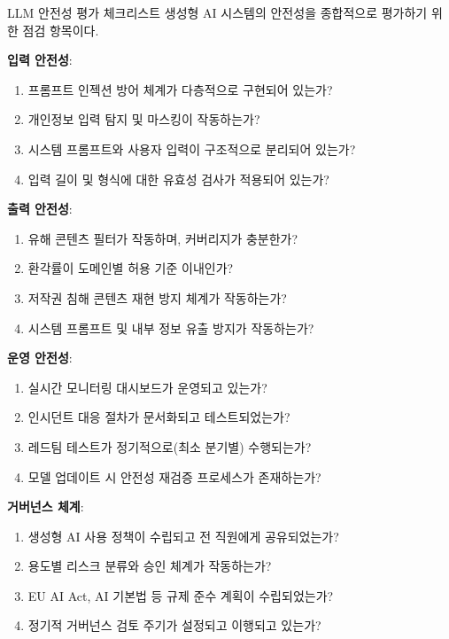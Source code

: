 \begin{practicaltool}{LLM 안전성 평가 체크리스트}
생성형 AI 시스템의 안전성을 종합적으로 평가하기 위한 점검 항목이다.

\textbf{입력 안전성}:
\begin{enumerate}
 \item 프롬프트 인젝션 방어 체계가 다층적으로 구현되어 있는가?
 \item 개인정보 입력 탐지 및 마스킹이 작동하는가?
 \item 시스템 프롬프트와 사용자 입력이 구조적으로 분리되어 있는가?
 \item 입력 길이 및 형식에 대한 유효성 검사가 적용되어 있는가?
\end{enumerate}

\textbf{출력 안전성}:
\begin{enumerate}
 \item 유해 콘텐츠 필터가 작동하며, 커버리지가 충분한가?
 \item 환각률이 도메인별 허용 기준 이내인가?
 \item 저작권 침해 콘텐츠 재현 방지 체계가 작동하는가?
 \item 시스템 프롬프트 및 내부 정보 유출 방지가 작동하는가?
\end{enumerate}

\textbf{운영 안전성}:
\begin{enumerate}
 \item 실시간 모니터링 대시보드가 운영되고 있는가?
 \item 인시던트 대응 절차가 문서화되고 테스트되었는가?
 \item 레드팀 테스트가 정기적으로(최소 분기별) 수행되는가?
 \item 모델 업데이트 시 안전성 재검증 프로세스가 존재하는가?
\end{enumerate}

\textbf{거버넌스 체계}:
\begin{enumerate}
 \item 생성형 AI 사용 정책이 수립되고 전 직원에게 공유되었는가?
 \item 용도별 리스크 분류와 승인 체계가 작동하는가?
 \item EU AI Act, AI 기본법 등 규제 준수 계획이 수립되었는가?
 \item 정기적 거버넌스 검토 주기가 설정되고 이행되고 있는가?
\end{enumerate}
\end{practicaltool}


